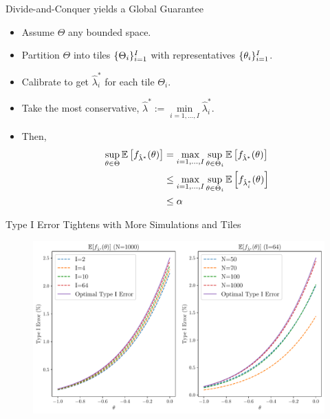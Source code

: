 \begin{frame}{Divide-and-Conquer yields a Global Guarantee}
\begin{itemize}
    \item Assume $\Theta$ any bounded space.
    \item Partition $\Theta$ into tiles $\{\Theta_i\}_{i=1}^I$ 
        with representatives $\{\theta_i\}_{i=1}^I$.
    \item Calibrate to get $\hat{\lambda}^*_i$ for each tile $\Theta_i$.
    \item Take the most conservative, $\hat{\lambda}^* := \min\limits_{i=1,\ldots, I} \hat{\lambda}^*_i$.
    \item Then,
        \begin{align*}
            \sup\limits_{\theta \in \Theta}
            \mathbb{E}\left[f_{\hat{\lambda}^*}(\theta)\right]
            &=
            \max\limits_{i=1,\ldots,I}
            \sup\limits_{\theta \in \Theta_i}
            \mathbb{E}\left[f_{\hat{\lambda}^*}(\theta)\right]
            \\&\leq 
            \max\limits_{i=1,\ldots,I}
            \sup\limits_{\theta \in \Theta_i}
            \mathbb{E}\left[f_{\hat{\lambda}^*_i}(\theta)\right]
            \\&\leq
            \alpha
        \end{align*}
\end{itemize} 
\end{frame}

\begin{frame}{Type I Error Tightens with More Simulations and Tiles}
\begin{figure}
    \centering
    \includegraphics[width=\linewidth]{figs/calibration_z_test.pdf}
\end{figure} 
\end{frame}


